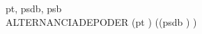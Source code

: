 \begin{circus}
\circchannel pt, psdb, psb \\
\circprocess ALTERNANCIADEPODER \circdef \circbegin
	\circspot
	  (pt \then \Skip)
	  \interleave ((psdb \then \Skip)
	  )
	  \\
\circend
\end{circus}
